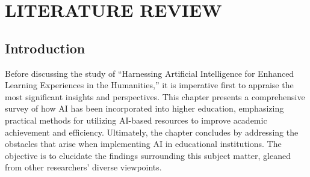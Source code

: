 \chapter{LITERATURE REVIEW}\label{ch:literature-review}
\section{Introduction}\label{sec:introduction}
\justifying
Before discussing the study of ``Harnessing Artificial Intelligence for Enhanced
Learning Experiences in the Humanities,'' it is imperative
first to appraise the most significant insights and perspectives. This chapter presents
a comprehensive survey of how AI has been incorporated into higher education, emphasizing
practical methods for utilizing AI-based resources to improve academic achievement and efficiency.
Ultimately, the chapter concludes by addressing the obstacles that arise when implementing AI in educational
institutions. The objective is to elucidate the findings surrounding this subject matter, gleaned from other
researchers' diverse viewpoints.



